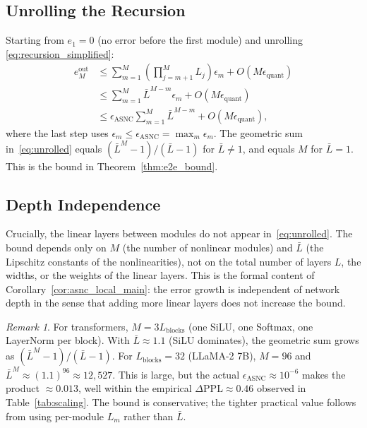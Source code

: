 \documentclass{article}
\theoremstyle{plain}
\theoremstyle{definition}
\theoremstyle{remark}
\newtheorem{remark}[theorem]{Remark}
\begin{document}
\subsection{Unrolling the Recursion}

Starting from $e_1 = 0$ (no error before the first module) and unrolling
\eqref{eq:recursion_simplified}:
\begin{align}
e_M^\mathrm{out}
&\le \sum_{m=1}^{M} \left(\prod_{j=m+1}^{M} L_j\right) \epsilon_m
    + O(M \epsilon_\mathrm{quant}) \nonumber \\
&\le \sum_{m=1}^{M} \bar{L}^{M-m} \epsilon_m
    + O(M \epsilon_\mathrm{quant}) \nonumber \\
&\le \epsilon_{\mathrm{ASNC}} \sum_{m=1}^{M} \bar{L}^{M-m}
    + O(M \epsilon_\mathrm{quant}), \label{eq:unrolled}
\end{align}
where the last step uses $\epsilon_m \le \epsilon_\mathrm{ASNC} = \max_m \epsilon_m$.
The geometric sum in~\eqref{eq:unrolled} equals $({\bar{L}^M - 1})/({\bar{L}-1})$
for $\bar{L} \ne 1$, and equals $M$ for $\bar{L} = 1$. This is the bound in
Theorem~\ref{thm:e2e_bound}.

\subsection{Depth Independence}

Crucially, the linear layers between modules do not appear in~\eqref{eq:unrolled}.
The bound depends only on $M$ (the number of nonlinear modules) and $\bar{L}$
(the Lipschitz constants of the nonlinearities), not on the total number of layers
$L$, the widths, or the weights of the linear layers. This is the formal content of
Corollary~\ref{cor:asnc_local_main}: the error growth is independent of network depth
in the sense that adding more linear layers does not increase the bound.

\begin{remark}
For transformers, $M = 3L_\mathrm{blocks}$ (one SiLU, one Softmax, one LayerNorm per
block). With $\bar{L} \approx 1.1$ (SiLU dominates), the geometric sum grows as
$(\bar{L}^M - 1)/(\bar{L} - 1)$. For $L_\mathrm{blocks} = 32$ (LLaMA-2 7B),
$M = 96$ and $\bar{L}^M \approx (1.1)^{96} \approx 12{,}527$. This is large, but the
actual $\epsilon_\mathrm{ASNC} \approx 10^{-6}$ makes the product
$\approx 0.013$, well within the empirical $\Delta\mathrm{PPL} \approx 0.46$
observed in Table~\ref{tab:scaling}. The bound is conservative; the tighter
practical value follows from using per-module $L_m$ rather than $\bar{L}$.
\end{remark}
\end{document}
